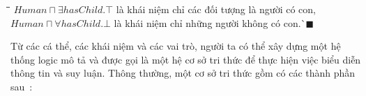 \documentclass[12pt,a4paper,twoside]{report}
\newcommand{\myend}		{\mbox{}\hfill\mbox{{\scriptsize$\!\blacksquare$}}}
\newcommand{\mand}		{\sqcap}
\newcommand{\V}			{\forall}
\newcommand{\E}			{\exists}
\newcommand{\Human}			{Human}
\newcommand{\hasChild}		{hasChild}
\theoremstyle{definition}
\begin{document}
\begin{tabbing}
  \hspace*{0.5cm}\=\hspace*{5.2cm}\=\hspace*{\textwidth}\=\kill
  \> $\Human \mand \E \hasChild.\top$ \> là khái niệm chỉ các đối tượng là người có con,\\[0.5ex]
  \> $\Human \mand \V \hasChild.\bot$ \> là khái niệm chỉ những người không có con.\`\myend
\end{tabbing}

Từ các cá thể, các khái niệm và các vai trò, người ta có thể xây dựng một hệ thống logic mô tả và được gọi là một hệ cơ sở tri thức để thực hiện việc biểu diễn thông tin và suy luận. Thông thường, một cơ sở tri thức gồm có các thành phần sau~\cite{DLHandbook2007}:
\end{document}
